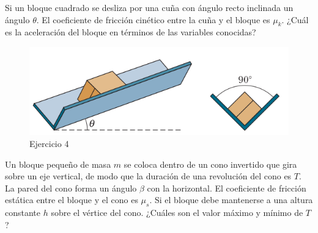 \begin{mdframed}[style=warning]
	\begin{ejercicio}
		Si un bloque cuadrado se desliza por una cuña con ángulo recto inclinada un ángulo $\theta$. El coeficiente de fricción cinético entre la cuña y el bloque es $\mu _k$. ¿Cuál es la aceleración del bloque en términos de las variables conocidas?
		\begin{figure}[H]
			\centering
			\includegraphics[scale=0.3]{./img/cuna.png}
			\caption{Ejercicio 4}
		\end{figure}
	\end{ejercicio}
\end{mdframed}








\begin{mdframed}[style=warning]
	\begin{ejercicio}
		Un bloque pequeño de masa $m$ se coloca dentro de un cono invertido que gira sobre un eje vertical, de modo que la duración de una revolución del cono es $T$. La pared del cono forma un ángulo $\beta$ con la horizontal. El coeficiente de fricción estática entre el bloque y el cono es $\mu _s$. Si el bloque debe mantenerse a una altura constante $h$ sobre el vértice del cono. ¿Cuáles son el valor máximo y mínimo de $T$?
	\end{ejercicio}
\end{mdframed}









